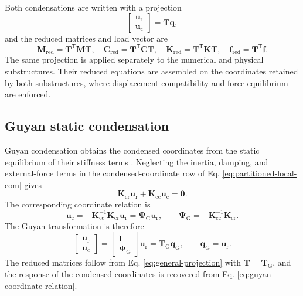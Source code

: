 \documentclass[a4paper,fleqn,review,12pt]{cas-sc}
\numberwithin{equation}{section}
\begin{document}
Both condensations are written with a projection
\begin{equation}
  \begin{bmatrix}
    \bm{u}_{\mathrm{r}}\\
    \bm{u}_{\mathrm{c}}
  \end{bmatrix}
  =\mathbf{T}\bm{q},
  \label{eq:general-projection-coordinate}
\end{equation}
and the reduced matrices and load vector are
\begin{equation}
  \mathbf{M}_{\mathrm{red}}=\mathbf{T}^{\mathsf{T}}\mathbf{M}\mathbf{T},
  \quad
  \mathbf{C}_{\mathrm{red}}=\mathbf{T}^{\mathsf{T}}\mathbf{C}\mathbf{T},
  \quad
  \mathbf{K}_{\mathrm{red}}=\mathbf{T}^{\mathsf{T}}\mathbf{K}\mathbf{T},
  \quad
  \bm{f}_{\mathrm{red}}=\mathbf{T}^{\mathsf{T}}\bm{f}.
  \label{eq:general-projection}
\end{equation}
The same projection is applied separately to the numerical and physical substructures. Their reduced equations are assembled on the coordinates retained by both substructures, where displacement compatibility and force equilibrium are enforced.

\subsection{Guyan static condensation}
\label{sec:guyan-condensation}

Guyan condensation obtains the condensed coordinates from the static equilibrium of their stiffness terms \cite{Guyan1965}. Neglecting the inertia, damping, and external-force terms in the condensed-coordinate row of Eq. \eqref{eq:partitioned-local-eom} gives
\begin{equation}
  \mathbf{K}_{\mathrm{cr}}\bm{u}_{\mathrm{r}}
  +\mathbf{K}_{\mathrm{cc}}\bm{u}_{\mathrm{c}}=\bm{0}.
  \label{eq:guyan-static-equilibrium}
\end{equation}
The corresponding coordinate relation is
\begin{equation}
  \bm{u}_{\mathrm{c}}
  =-\mathbf{K}_{\mathrm{cc}}^{-1}\mathbf{K}_{\mathrm{cr}}\bm{u}_{\mathrm{r}}
  =\bm{\Psi}_{\mathrm{G}}\bm{u}_{\mathrm{r}},
  \qquad
  \bm{\Psi}_{\mathrm{G}}
  =-\mathbf{K}_{\mathrm{cc}}^{-1}\mathbf{K}_{\mathrm{cr}}.
  \label{eq:guyan-coordinate-relation}
\end{equation}
The Guyan transformation is therefore
\begin{equation}
  \begin{bmatrix}
    \bm{u}_{\mathrm{r}}\\
    \bm{u}_{\mathrm{c}}
  \end{bmatrix}
  =
  \begin{bmatrix}
    \mathbf{I}\\
    \bm{\Psi}_{\mathrm{G}}
  \end{bmatrix}
  \bm{u}_{\mathrm{r}}
  =\mathbf{T}_{\mathrm{G}}\bm{q}_{\mathrm{G}},
  \qquad
  \bm{q}_{\mathrm{G}}=\bm{u}_{\mathrm{r}}.
  \label{eq:guyan-transformation}
\end{equation}
The reduced matrices follow from Eq. \eqref{eq:general-projection} with \(\mathbf{T}=\mathbf{T}_{\mathrm{G}}\), and the response of the condensed coordinates is recovered from Eq. \eqref{eq:guyan-coordinate-relation}.
\end{document}
